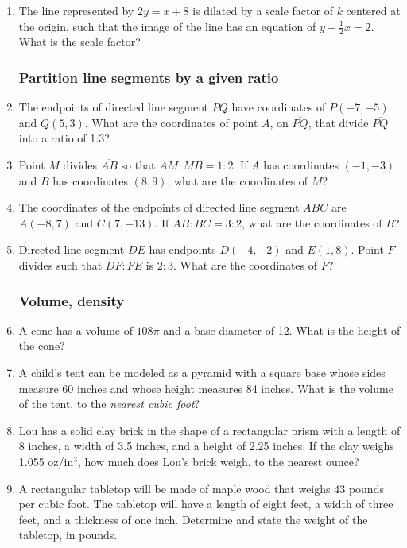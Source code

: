 \documentclass[12pt, oneside]{article}
\begin{document}
\begin{enumerate}[itemsep=0cm]
\item The line represented by $2y=x+8$ is dilated by a scale factor of $k$ centered at the origin, such that the image of the line has an equation of $y - \frac{1}{2} x=2$. What is the scale factor?
  
\newpage
\subsubsection*{Partition line segments by a given ratio}
\item The endpoints of directed line segment $PQ$ have coordinates of
$P(-7,-5)$ and $Q(5,3)$. What are the coordinates of point $A$, on $\overline{PQ}$, that divide $\overline{PQ}$ into a ratio of 1:3?

\item Point $M$ divides $\overline{AB}$ so that $AM:MB = 1:2$. If $A$ has coordinates $(-1,-3)$ and $B$ has coordinates $(8,9)$, what are the coordinates of $M$?

\item The coordinates of the endpoints of directed line segment $ABC$ are $A(-8,7)$ and $C(7,-13)$. If $AB:BC = 3:2$, what are the coordinates of $B$?

\item Directed line segment $DE$ has endpoints $D(-4, -2)$ and $E(1,8)$.
Point $F$ divides such that $DF:FE$ is $2:3$. What are the coordinates
of $F$?

\newpage
\subsubsection*{Volume, density}
\item A cone has a volume of $108\pi$ and a base diameter of 12. What is the
height of the cone?

\item A child's tent can be modeled as a pyramid with a square base whose sides measure 60 inches and whose height measures 84 inches. What
is the volume of the tent, to the \emph{nearest cubic foot}?

\item Lou has a solid clay brick in the shape of a rectangular prism with a length of 8 inches, a width of 3.5 inches, and a height of 2.25 inches. If the clay weighs 1.055 oz/in$^3$, how much does Lou's brick weigh, to the nearest ounce? 

\item A rectangular tabletop will be made of maple wood that weighs 43 pounds per cubic foot. The tabletop will have a length of eight feet, a width of three feet, and a thickness of one inch. Determine and state the weight of the tabletop, in pounds.


\end{enumerate}
\end{document}
